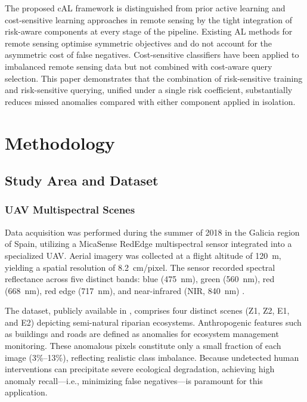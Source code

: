 \documentclass[lettersize,journal]{IEEEtran}
\begin{document}
The proposed cAL framework is distinguished from prior active learning and
cost-sensitive learning approaches in remote sensing by the tight
integration of risk-aware components at every stage of the pipeline.
Existing AL methods for remote sensing optimise symmetric objectives and
do not account for the asymmetric cost of false negatives. Cost-sensitive
classifiers have been applied to imbalanced remote sensing data but not
combined with cost-aware query selection. This paper demonstrates that the
combination of risk-sensitive training and risk-sensitive querying, unified
under a single risk coefficient, substantially reduces missed anomalies
compared with either component applied in isolation.

\section{Methodology}

\subsection{Study Area and Dataset}

\subsubsection{UAV Multispectral Scenes}

Data acquisition was performed during the summer of 2018 in the
Galicia region of Spain, utilizing a MicaSense RedEdge multispectral
sensor integrated into a specialized UAV. Aerial imagery was collected
at a flight altitude of 120~m, yielding a spatial resolution of
8.2~cm/pixel. The sensor recorded spectral reflectance across five
distinct bands: blue (475~nm), green (560~nm), red (668~nm), red edge
(717~nm), and near-infrared (NIR, 840~nm) \cite{arguello2021watershed}.

The dataset, publicly available in \cite{galicianriversaddataset},
comprises four distinct scenes (Z1, Z2, E1, and E2) depicting
semi-natural riparian ecosystems. Anthropogenic features such as
buildings and roads are defined as anomalies for ecosystem management
monitoring. These anomalous pixels constitute only a small fraction of
each image (3\%--13\%), reflecting realistic class imbalance. Because
undetected human interventions can precipitate severe ecological
degradation, achieving high anomaly recall---i.e., minimizing false
negatives---is paramount for this application.
\end{document}
